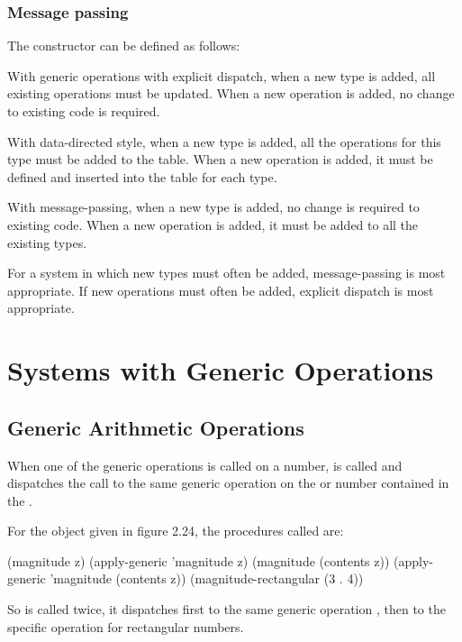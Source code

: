 \subsubsection{Message passing}

\begin{exe}[2.75]
    The constructor  can be defined as follows:
\end{exe}

\begin{exe}[2.76]
    With generic operations with explicit dispatch, when a new type is added, 
    all existing operations must be updated. When a new operation is added, no 
    change to existing code is required.

    With data-directed style, when a new type is added, all the operations for 
    this type must be added to the table. When a new operation is added, it must be 
    defined and inserted into the table for each type.

    With message-passing, when a new type is added, no change is required to 
    existing code. When a new operation is added, it must be added to all the 
    existing types.

    \medskip

    For a system in which new types must often be added, message-passing is most 
    appropriate. If new operations must often be added, explicit dispatch is 
    most appropriate.
\end{exe}

\section{Systems with Generic Operations}

\subsection{Generic Arithmetic Operations}

\begin{exe}[2.77]
    When one of the generic operations is called on a  number, 
     is called and dispatches the call to the same generic 
    operation on the  or  number contained in the 
    .

    For the object  given in figure 2.24, the procedures called are:
    \begin{cscm}
        (magnitude z)
        (apply-generic 'magnitude z)
        (magnitude (contents z))
        (apply-generic 'magnitude (contents z))
        (magnitude-rectangular (3 . 4))
    \end{cscm}
    So  is called twice, it dispatches first to the same 
    generic operation , then to the specific operation for 
    rectangular numbers.
\end{exe}

